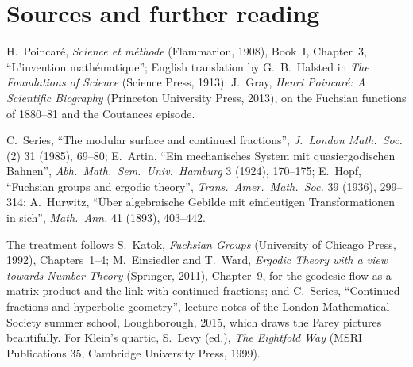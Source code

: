 \section*{Sources and further reading}

H.~Poincaré, \emph{Science et méthode} (Flammarion, 1908), Book~I, Chapter~3, ``L'invention mathématique''; English translation by G.~B.~Halsted in \emph{The Foundations of Science} (Science
Press, 1913). J.~Gray, \emph{Henri Poincaré: A Scientific Biography} (Princeton University Press, 2013), on the Fuchsian functions of 1880--81 and the Coutances episode.

C.~Series, ``The modular surface and continued fractions'', \emph{J.\ London Math.\ Soc.} (2) 31 (1985), 69--80; E.~Artin, ``Ein mechanisches System mit quasiergodischen Bahnen'', \emph{Abh.\ Math.\
Sem.\ Univ.\ Hamburg} 3 (1924), 170--175; E.~Hopf, ``Fuchsian groups and ergodic theory'', \emph{Trans.\ Amer.\ Math.\ Soc.} 39 (1936), 299--314; A.~Hurwitz, ``\"Uber algebraische Gebilde mit
eindeutigen Transformationen in sich'', \emph{Math.\ Ann.} 41 (1893), 403--442.

The treatment follows S.~Katok, \emph{Fuchsian Groups} (University of Chicago Press, 1992), Chapters~1--4; M.~Einsiedler and T.~Ward, \emph{Ergodic Theory with a view towards Number Theory}
(Springer, 2011), Chapter~9, for the geodesic flow as a matrix product and the link with continued fractions; and C.~Series, ``Continued fractions and hyperbolic geometry'', lecture notes of
the London Mathematical Society summer school, Loughborough, 2015, which draws the Farey pictures beautifully. For Klein's quartic, S.~Levy (ed.), \emph{The Eightfold Way} (MSRI
Publications 35, Cambridge University Press, 1999).
